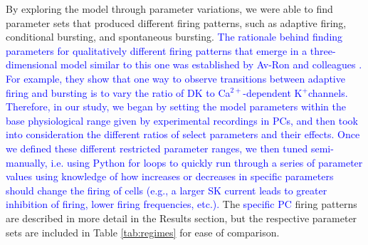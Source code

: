 \documentclass[10pt,letterpaper]{article}
\newcommand{\Ca}{Ca$^{2+}$}
\newcommand{\K}{K$^{+}$}
\newcommand{\edit}[1]{\textcolor{blue}{#1}}
\begin{document}
By exploring the model through parameter variations, we were able to find parameter sets that produced different firing patterns, such as adaptive firing, conditional bursting, and spontaneous bursting. \edit{The rationale behind finding parameters for qualitatively different firing patterns that emerge in a three-dimensional model similar to this one was established by Av-Ron and colleagues \cite{avron1993basic}. For example, they show that one way to observe transitions between adaptive firing and bursting is to vary the ratio of DK to \Ca-dependent \K channels. Therefore, in our study, we began by setting the model parameters within the base physiological range given by experimental recordings in PCs, and then took into consideration the different ratios of select parameters and their effects. Once we defined these different restricted parameter ranges, we then tuned semi-manually, i.e. using Python for loops to quickly run through a series of parameter values using knowledge of how increases or decreases in specific parameters should change the firing of cells (e.g., a larger SK current leads to greater inhibition of firing, lower firing frequencies, etc.).} The \edit{specific PC} firing patterns are described in more detail in the Results section, but the respective parameter sets are included in Table \ref{tab:regimes} for ease of comparison.
\end{document}
